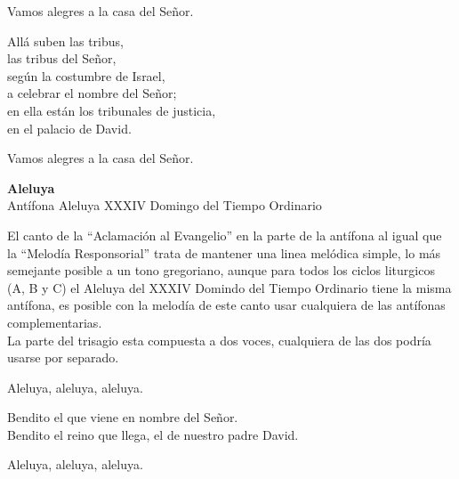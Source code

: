 \documentclass[12pt, letterpaper]{report}
\begin{document}
    \noindent
    Vamos alegres a la casa del Se\~nor.

    \noindent
    All\'a suben las tribus,\\
    las tribus del Se\~nor,\\
    seg\'un la costumbre de Israel,\\
    a celebrar el nombre del Se\~nor;\\
    en ella est\'an los tribunales de justicia,\\
    en el palacio de David.

    \noindent
    Vamos alegres a la casa del Se\~nor.
    \clearpage


    
    \begin{center}
        \Huge {\bfseries Aleluya}\\
        \LARGE Ant\'ifona Aleluya XXXIV Domingo del Tiempo Ordinario
    \end{center}

    \Large El canto de la ``Aclamaci\'on al Evangelio'' en la parte de la ant\'ifona al igual que la ``Melod\'ia Responsorial'' trata de mantener una linea mel\'odica simple, lo m\'as semejante posible a un tono gregoriano, aunque para todos los ciclos liturgicos (A, B y C) el Aleluya del XXXIV Domindo del Tiempo Ordinario tiene la misma ant\'ifona, es posible con la melod\'ia de este canto usar cualquiera de las ant\'ifonas complementarias.\\
    La parte del trisagio esta compuesta a dos voces, cualquiera de las dos podr\'ia usarse por separado.

    \noindent
    \LARGE Aleluya, aleluya, aleluya.

    \noindent
    Bendito el que viene en nombre del Se\~nor.\\
    Bendito el reino que llega, el de nuestro padre David.

    \noindent
    Aleluya, aleluya, aleluya.
    \clearpage
\end{document}
